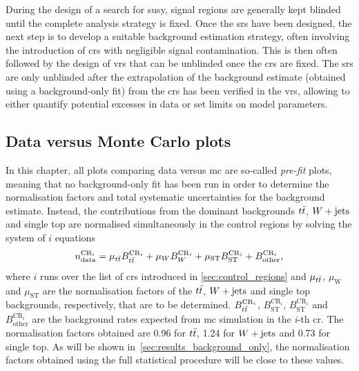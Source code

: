 During the design of a search for \gls{susy}, signal regions are generally kept blinded until the complete analysis strategy is fixed. Once the \glspl{sr} have been designed, the next step is to develop a suitable background estimation strategy, often involving the introduction of \glspl{cr} with negligible signal contamination. This is then often followed by the design of \glspl{vr} that can be unblinded once the \glspl{cr} are fixed. The \glspl{sr} are only unblinded after the extrapolation of the background estimate (obtained using a background-only fit) from the \glspl{cr} has been verified in the \glspl{vr}, allowing to either quantify potential excesses in data or set limits on model parameters. 

\subsection{Data versus Monte Carlo plots}

In this chapter, all plots comparing data versus \gls{mc} are so-called \textit{pre-fit} plots, meaning that no background-only fit has been run in order to determine the normalisation factors and total systematic uncertainties for the background estimate. Instead, the contributions from the dominant backgrounds $t\bar{t}$, $W+\mathrm{jets}$ and single top are normalised simultaneously in the control regions by solving the system of $i$ equations
\begin{equation}
		n_\mathrm{data}^{\mathrm{CR}_i} = \mu_{t\bar{t}} B_{t\bar{t}}^{\mathrm{CR}_i} + \mu_{W} B_{W}^{\mathrm{CR}_i} + \mu_\mathrm{ST} B_\mathrm{ST}^{\mathrm{CR}_i} + B_\mathrm{other}^{\mathrm{CR}_i},
\end{equation}
where $i$ runs over the list of \glspl{cr} introduced in \cref{sec:control_regions} and $\mu_{t\bar{t}}$, $\mu_\mathrm{W}$ and $\mu_\mathrm{ST}$ are the normalisation factors of the $t\bar{t}$, $W+\mathrm{jets}$ and single top backgrounds, respectively, that are to be determined. $B_{t\bar{t}}^{\mathrm{CR}_i}$, $B_\mathrm{ST}^{\mathrm{CR}_i}$, $B_\mathrm{ST}^{\mathrm{CR}_i}$ and $B_\mathrm{other}^{\mathrm{CR}_i}$ are the background rates expected from \gls{mc} simulation in the \textit{i}-th \gls{cr}. The normalisation factors obtained are 0.96 for $t\bar{t}$, 1.24 for $W+\mathrm{jets}$ and 0.73 for single top. As will be shown in~\cref{sec:results_background_only}, the normalisation factors obtained using the full statistical procedure will be close to these values.

